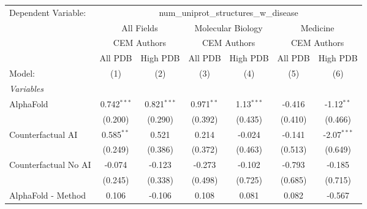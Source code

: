 \begingroup
\centering
\begin{tabular}{lcccccc}
   \tabularnewline \midrule \midrule
   Dependent Variable: & \multicolumn{6}{c}{num\_uniprot\_structures\_w\_disease}\\
 & \multicolumn{2}{c}{All Fields} & \multicolumn{2}{c}{Molecular Biology} & \multicolumn{2}{c}{Medicine} \\
\cmidrule(lr){2-3} \cmidrule(lr){4-5} \cmidrule(lr){6-7}
 & \multicolumn{2}{c}{CEM Authors} & \multicolumn{2}{c}{CEM Authors} & \multicolumn{2}{c}{CEM Authors} \\
\cmidrule(lr){2-3} \cmidrule(lr){4-5} \cmidrule(lr){6-7}
 & \multicolumn{1}{c}{All PDB} & \multicolumn{1}{c}{High PDB} & \multicolumn{1}{c}{All PDB} & \multicolumn{1}{c}{High PDB} & \multicolumn{1}{c}{All PDB} & \multicolumn{1}{c}{High PDB} \\
\cmidrule(lr){2-2} \cmidrule(lr){3-3} \cmidrule(lr){4-4} \cmidrule(lr){5-5} \cmidrule(lr){6-6} \cmidrule(lr){7-7}
   Model:                                                     & (1)           & (2)           & (3)          & (4)          & (5)           & (6)\\  
   \midrule
   \emph{Variables}\\
   AlphaFold                                                  & 0.742$^{***}$ & 0.821$^{***}$ & 0.971$^{**}$ & 1.13$^{***}$ & -0.416        & -1.12$^{**}$\\   
                                                              & (0.200)       & (0.290)       & (0.392)      & (0.435)      & (0.410)       & (0.466)\\   
   Counterfactual AI                                          & 0.585$^{**}$  & 0.521         & 0.214        & -0.024       & -0.141        & -2.07$^{***}$\\   
                                                              & (0.249)       & (0.386)       & (0.372)      & (0.463)      & (0.513)       & (0.649)\\   
   Counterfactual No AI                                       & -0.074        & -0.123        & -0.273       & -0.102       & -0.793        & -0.185\\   
                                                              & (0.245)       & (0.338)       & (0.498)      & (0.725)      & (0.685)       & (0.715)\\   
   AlphaFold - Method                                         & 0.106         & -0.106        & 0.108        & 0.081        & 0.082         & -0.567\\   

\end{tabular}
